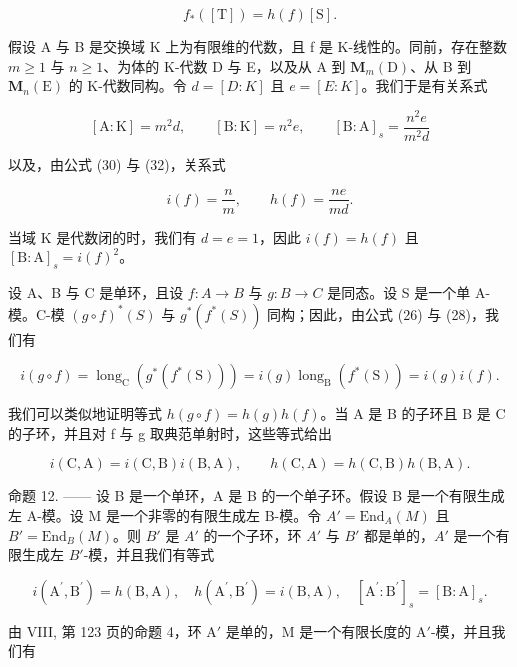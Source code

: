 \[
f _ {*} ([ \mathrm{T} ]) = h (f) [ \mathrm{S} ].\tag{33}
\]

假设 A 与 B 是交换域 K 上为有限维的代数，且 f 是 K-线性的。同前，存在整数 \(m \geqslant 1\) 与 \(n \geqslant 1\)、为体的 K-代数 D 与 E，以及从 A 到 \(\mathbf{M}_{m}(\mathrm{D})\)、从 B 到 \(\mathbf{M}_{n}(\mathrm{E})\) 的 K-代数同构。令 \(d = [D : K]\) 且 \(e = [E : K]\)。我们于是有关系式

\[
[ \mathrm{A}: \mathrm{K} ] = m ^ {2} d, \qquad [ \mathrm{B}: \mathrm{K} ] = n ^ {2} e, \qquad [ \mathrm{B}: \mathrm{A} ] _ {s} = \frac {n ^ {2} e}{m ^ {2} d}
\]

以及，由公式 (30) 与 (32)，关系式

\[
i (f) = \frac {n}{m}, \qquad h (f) = \frac {n e}{m d}.
\]

当域 \(\mathrm{K}\) 是代数闭的时，我们有 \(d = e = 1\)，因此 \(i(f) = h(f)\) 且 \([\mathrm{B}:\mathrm{A}]_s = i(f)^2\)。

设 A、B 与 C 是单环，且设 \(f: A \to B\) 与 \(g: B \to C\) 是同态。设 S 是一个单 A-模。C-模 \((g \circ f)^{*}(S)\) 与 \(g^{*}(f^{*}(S))\) 同构；因此，由公式 (26) 与 (28)，我们有

\[
i (g \circ f) = \operatorname{long} _ {\mathrm{C}} \left(g ^ {*} \left(f ^ {*} (\mathrm{S})\right)\right) = i (g) \operatorname{long} _ {\mathrm{B}} \left(f ^ {*} (\mathrm{S})\right) = i (g) i (f).
\]

我们可以类似地证明等式 \(h(g \circ f) = h(g)h(f)\)。当 A 是 B 的子环且 B 是 C 的子环，并且对 f 与 g 取典范单射时，这些等式给出

\[
i (\mathrm{C}, \mathrm{A}) = i (\mathrm{C}, \mathrm{B}) i (\mathrm{B}, \mathrm{A}), \qquad h (\mathrm{C}, \mathrm{A}) = h (\mathrm{C}, \mathrm{B}) h (\mathrm{B}, \mathrm{A}).\tag{34}
\]

命题 12. —— 设 B 是一个单环，A 是 B 的一个单子环。假设 B 是一个有限生成左 A-模。设 M 是一个非零的有限生成左 B-模。令 \(A' = \text{End}_{A}(M)\) 且 \(B' = \text{End}_{B}(M)\)。则 \(B'\) 是 \(A'\) 的一个子环，环 \(A'\) 与 \(B'\) 都是单的，\(A'\) 是一个有限生成左 \(B'\)-模，并且我们有等式

\[
i (\mathrm{A} ^ {\prime}, \mathrm{B} ^ {\prime}) = h (\mathrm{B}, \mathrm{A}), \quad h (\mathrm{A} ^ {\prime}, \mathrm{B} ^ {\prime}) = i (\mathrm{B}, \mathrm{A}), \quad [ \mathrm{A} ^ {\prime}: \mathrm{B} ^ {\prime} ] _ {s} = [ \mathrm{B}: \mathrm{A} ] _ {s}.
\]

由 VIII, 第 123 页的命题 4，环 \(\mathrm{A}'\) 是单的，\(\mathrm{M}\) 是一个有限长度的 \(\mathrm{A}'\)-模，并且我们有


